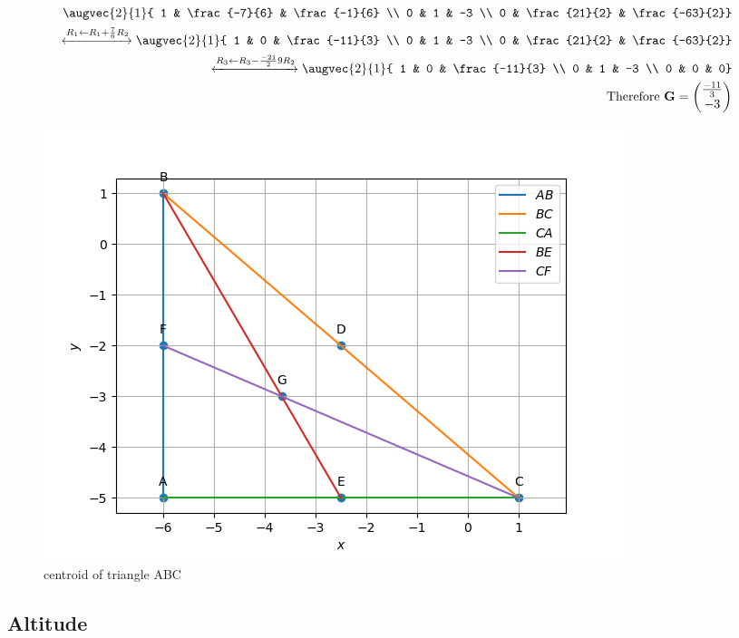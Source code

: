 \documentclass[11pt]{book}
\begin{document}
\begin{enumerate}[label=\thesubsection.\arabic*.,ref=\thesubsection.\theenumi]
\begin{align}
\augvec{2}{1}{ 1 & \frac{-7}{6} & \frac{-1}{6} \\ 0 & 1 & -3 \\ 0 & \frac{21}{2} & \frac{-63}{2}} \\
\xleftrightarrow[]{R_1\leftarrow R_1+\frac{7}{6}R_2}
\augvec{2}{1}{ 1 & 0 & \frac{-11}{3} \\ 0 & 1 & -3 \\ 0 & \frac{21}{2} & \frac{-63}{2}} \\
\xleftrightarrow[]{R_3\leftarrow R_3-\frac{-21}{2}9R_2}
\augvec{2}{1}{ 1 & 0 & \frac{-11}{3} \\ 0 & 1 & -3 \\ 0 & 0 & 0} \\
 \text{Therefore } \vec{G}=\myvec { \frac{-11}{3} \\ -3}
\end{align} 
\begin{figure}[H]
    \centering
    \includegraphics{figs/centriod.png}
    \caption{centroid of triangle ABC}
    \label{fig:mat_med2}
\end{figure}
\end{enumerate}


\subsection{Altitude}
\end{document}
